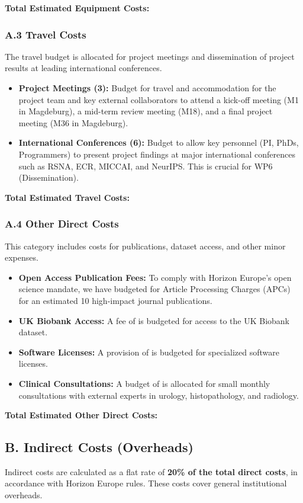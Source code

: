 \textbf{Total Estimated Equipment Costs: }

\subsubsection*{A.3 Travel Costs}
The travel budget is allocated for project meetings and dissemination of project results at leading international conferences.
\begin{itemize}
    \item \textbf{Project Meetings (3):} Budget for travel and accommodation for the project team and key external collaborators to attend a kick-off meeting (M1 in Magdeburg), a mid-term review meeting (M18), and a final project meeting (M36 in Magdeburg).
    \item \textbf{International Conferences (6):} Budget to allow key personnel (PI, PhDs, Programmers) to present project findings at major international conferences such as RSNA, ECR, MICCAI, and NeurIPS. This is crucial for WP6 (Dissemination).
\end{itemize}

\textbf{Total Estimated Travel Costs: }

\subsubsection*{A.4 Other Direct Costs}
This category includes costs for publications, dataset access, and other minor expenses.
\begin{itemize}
    \item \textbf{Open Access Publication Fees:} To comply with Horizon Europe's open science mandate, we have budgeted for Article Processing Charges (APCs) for an estimated 10 high-impact journal publications.
    \item \textbf{UK Biobank Access:} A fee of  is budgeted for access to the UK Biobank dataset.
    \item \textbf{Software Licenses:} A provision of  is budgeted for specialized software licenses.
    \item \textbf{Clinical Consultations:} A budget of  is allocated for small monthly consultations with external experts in urology, histopathology, and radiology.
\end{itemize}

\textbf{Total Estimated Other Direct Costs: }

\subsection*{B. Indirect Costs (Overheads)}
Indirect costs are calculated as a flat rate of \textbf{20\% of the total direct costs}, in accordance with Horizon Europe rules. These costs cover general institutional overheads.

